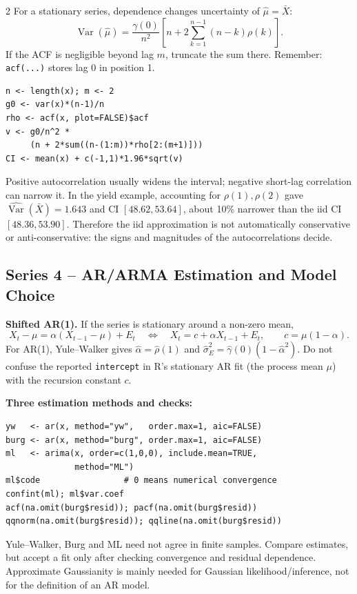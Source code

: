 \documentclass[9pt,a4paper]{extarticle}
\newcommand{\key}[1]{\textbf{#1}}
\begin{document}
\begin{multicols}{2}
For a stationary series, dependence changes uncertainty of \(\widehat\mu=\bar X\):
\[
\boxed{\operatorname{Var}(\widehat\mu)=
\frac{\gamma(0)}{n^2}
\left[n+2\sum_{k=1}^{n-1}(n-k)\rho(k)\right].}
\]
If the ACF is negligible beyond lag \(m\), truncate the sum there. Remember: \texttt{acf(...)} stores lag 0 in position 1.
{\scriptsize
\begin{verbatim}
n <- length(x); m <- 2
g0 <- var(x)*(n-1)/n
rho <- acf(x, plot=FALSE)$acf
v <- g0/n^2 *
     (n + 2*sum((n-(1:m))*rho[2:(m+1)]))
CI <- mean(x) + c(-1,1)*1.96*sqrt(v)
\end{verbatim}}
Positive autocorrelation usually widens the interval; negative short-lag correlation can narrow it. In the yield example, accounting for \(\rho(1),\rho(2)\) gave \(\widehat{\operatorname{Var}}(\bar X)=1.643\) and CI \([48.62,53.64]\), about 10\% narrower than the iid CI \([48.36,53.90]\). Therefore the iid approximation is not automatically conservative or anti-conservative: the signs and magnitudes of the autocorrelations decide.

\subsection*{Series 4 -- AR/ARMA Estimation and Model Choice}

\key{Shifted AR(1).} If the series is stationary around a non-zero mean,
\[
X_t-\mu=\alpha(X_{t-1}-\mu)+E_t
\quad\Longleftrightarrow\quad
X_t=c+\alpha X_{t-1}+E_t,\qquad c=\mu(1-\alpha).
\]
For AR(1), Yule--Walker gives \(\widehat\alpha=\widehat\rho(1)\) and
\(\widehat\sigma_E^2=\widehat\gamma(0)(1-\widehat\alpha^2)\). Do not confuse the reported \texttt{intercept} in R's stationary AR fit (the process mean \(\mu\)) with the recursion constant \(c\).

\key{Three estimation methods and checks:}
{\scriptsize
\begin{verbatim}
yw   <- ar(x, method="yw",   order.max=1, aic=FALSE)
burg <- ar(x, method="burg", order.max=1, aic=FALSE)
ml   <- arima(x, order=c(1,0,0), include.mean=TRUE,
              method="ML")
ml$code                 # 0 means numerical convergence
confint(ml); ml$var.coef
acf(na.omit(burg$resid)); pacf(na.omit(burg$resid))
qqnorm(na.omit(burg$resid)); qqline(na.omit(burg$resid))
\end{verbatim}}
Yule--Walker, Burg and ML need not agree in finite samples. Compare estimates, but accept a fit only after checking convergence and residual dependence. Approximate Gaussianity is mainly needed for Gaussian likelihood/inference, not for the definition of an AR model.


\end{multicols}
\end{document}
